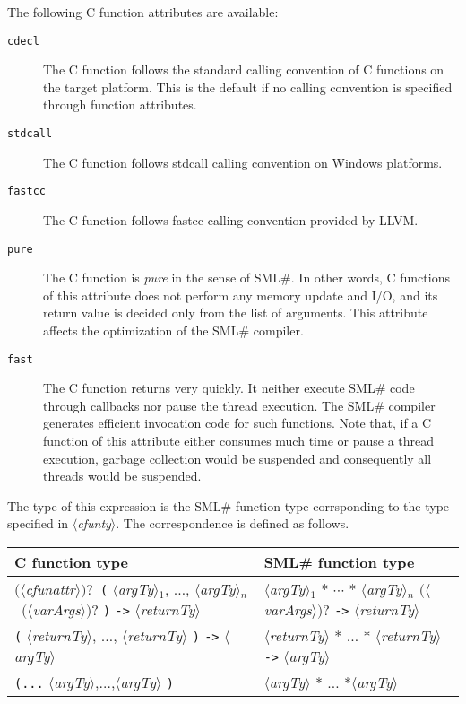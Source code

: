 \documentclass{jbook}
\newcommand{\smlsharp}{SML\#}
\newcommand{\nonterm}[1]{\mbox{$\langle$}{\it #1}\mbox{$\rangle$}}
\newcommand{\term}[1]{\mbox{{\tt #1}}}
\newcommand{\optional}[1]{\mbox{$($}{\protect #1}\mbox{$)?$}}
\begin{document}
	The following C function attributes are available:
\begin{description}
\item[{\tt cdecl}]
	The C function follows the standard calling convention of C
functions on the target platform.
	This is the default if no calling convention is specified
through function attributes.
\item[{\tt stdcall}]
	The C function follows stdcall calling convention on
Windows platforms.
\item[{\tt fastcc}]
	The C function follows fastcc calling convention provided
by LLVM.
\item[{\tt pure}]
	The C function is {\em pure\/} in the sense of \smlsharp{}.
	In other words,
C functions of this attribute does not perform
any memory update and I/O,
and its return value is decided only from the list of arguments.
	This attribute affects the optimization of
the \smlsharp{} compiler.
\item[{\tt fast}]
	The C function returns very quickly.
	It neither execute \smlsharp{} code through callbacks
nor pause the thread execution.
	The \smlsharp{} compiler generates efficient invocation code
for such functions.
	Note that,
if a C function of this attribute either consumes much time
or pause a thread execution,
garbage collection would be suspended and consequently
all threads would be suspended.
\end{description}

	The type of this expression is the \smlsharp{} function
type corrsponding to the type specified in \nonterm{cfunty}.
	The correspondence is defined as follows.

\begin{center}
\begin{tabular}{|l|l|}
\hline
C function type & \smlsharp{} function type
\\\hline
\optional{\nonterm{cfunattr}}\ 
\term{(} \nonterm{argTy}$_1$, $\ldots$, \nonterm{argTy}$_n$\
       \optional{\nonterm{varArgs}} \term{)}
 \term{->} \nonterm{returnTy}
&
\nonterm{argTy}$_1$ * $\cdots$ * \nonterm{argTy}$_n$  \optional{* \nonterm{varArgs}} \term{->}
    \nonterm{returnTy}
\\\hline
\term{(} \nonterm{returnTy}, $\ldots$, \nonterm{returnTy} \term{)} \term{->}
\nonterm{argTy}
&
\nonterm{returnTy} * $\ldots$ * \nonterm{returnTy} \term{->} \nonterm{argTy}
\\\hline
\term{(...} \nonterm{argTy},$\ldots$,\nonterm{argTy} \term{)} &
\nonterm{argTy} * $\ldots$ *\nonterm{argTy}
\\\hline
\end{tabular}
\end{center}
\end{document}
